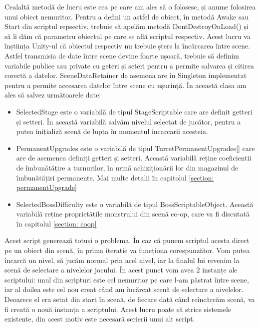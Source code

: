 \documentclass[12pt, a4paper]{article}
\begin{document}
	Cealaltă metodă de lucru este cea pe care am ales să o folosesc, și anume folosirea unui obiect nemuritor. Pentru a defini un astfel de obiect, în metodă Awake sau Start din scriptul repsectiv, trebuie să apelăm metodă DontDestroyOnLoad() și să îi dăm că parametru obiectul pe care se află scriptul respectiv. Acest lucru va înștiința Unity-ul că obiectul respectiv nu trebuie șters la încărcarea între scene. Astfel transmisia de date între scene devine foarte ușoară, trebuie să definim variabile publice sau private cu geteri și seteri pentru a permite salvarea și citirea corectă a datelor. SceneDataRetainer de asemena are în Singleton implementat pentru a permite accesarea datelor între scene cu ușurință. În această clasa am ales să salvez următoarele date:
	
	\begin{itemize}
		\item SelectedStage este o variabilă de tipul StageScriptable care are definit getteri și setteri. În această variabilă salvăm nivelul selectat de jucător, pentru a putea inițializă scenă de lupta în momentul incarcarii acesteia.
		\item PermanentUpgrades este o variabilă de tipul TurretPermanentUpgrades[] care are de asemenea definiți getteri și setteri. Această variabilă reține coeficientii de îmbunătățire a turnurilor, în urmă achiziționării lor din magazinul de îmbunătățiri permanente. Mai multe detalii în capitolul \ref{section: permanentUpgrade}
		\item SelectedBossDifficulty este o variabilă de tipul BossScriptableObject. Această variabilă reține proprietățile monstrului din scenă co-op, care va fi discutată în capitolul \ref{section: coop}
	\end{itemize}
	
	Acest script generează totuși o problema. În caz că punem scriptul acesta direct pe un obiect din scenă, în prima iteratie va funcționa corespunzător. Vom putea încarcă un nivel, să jucăm normal prin acel nivel, iar la finalul lui revenim la scenă de selectare a nivelelor jocului. În acest punct vom avea 2 instanțe ale scriptului: unul din scripturi este cel nemuritor pe care l-am păstrat între scene, iar al doilea este cel nou creat când am încărcat scenă de selectare a nivelelor. Deoarece el era setat din start în scenă, de fiecare dată când reîncărcăm scenă, va fi creată o nouă instanța a scriptului. Acest lucru poate să strice sistemele existente, din acest motiv este necesară scrierii unui alt script.
	\newline
	
\end{document}
